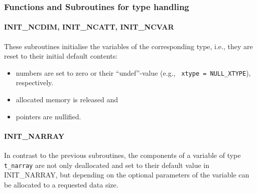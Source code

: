 \documentclass[11pt,twoside]{article}
\begin{document}
\subsubsection{Functions and Subroutines for type handling}
\paragraph{INIT\_NCDIM, INIT\_NCATT, INIT\_NCVAR\\\label{INITNC}}

These subroutines initialise the variables of the corresponding type, i.e.,
they are reset to their initial default contents:
\begin{itemize}
\item numbers are set to zero or their ``undef''-value 
(e.g., \verb| xtype = NULL_XTYPE|), respectively.
\item allocated memory is released and
\item pointers are nullified.
\end{itemize}

\paragraph{INIT\_NARRAY\\ \label{INITNARRAY}}

In contrast to the previous subroutines, the components of a variable
of type \verb|t_narray| are not only deallocated and set to their 
default value in INIT\_NARRAY, but depending on the optional parameters
of the variable can be allocated to a requested data size.
\end{document}
